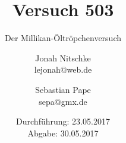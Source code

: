 

\title{Versuch 503}
\subtitle{Der Millikan-Öltröpchenversuch}
\author{Jonah Nitschke\\
        lejonah@web.de \and
        Sebastian Pape\\
        sepa@gmx.de}
\date{Durchführung: 23.05.2017\\
      Abgabe: 30.05.2017}



\maketitle
\newpage
\setcounter{page}{1}


\newpage


\newpage

\printbibliography


